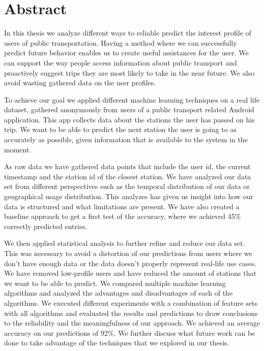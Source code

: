 \newpage
\chapter*{\centering Abstract}

In this thesis we analyze different ways to reliable predict the interest profile of users of public transportation. Having a method where we can successfully predict future behavior enables us to create useful assistances for the user. We can support the way people access information about public transport and proactively suggest trips they are most likely to take in the near future. We also avoid wasting gathered data on the user profiles.

To achieve our goal we applied different machine learning techniques on a real life dataset, gathered anonymously from users of a public transport related Android application. This app collects data about the stations the user has passed on his trip. We want to be able to predict the next station the user is going to as accurately as possible, given information that is available to the system in the moment.

As raw data we have gathered data points that include the user id, the current timestamp and the station id of the closest station. We have analyzed our data set from different perspectives such as the temporal distribution of our data or geographical usage distribution. This analyzes has given us insight into how our data is structured and what limitations are present. We have also created a baseline approach to get a first test of the accuracy, where we achieved 45\% correctly predicted entries.

We then applied statistical analysis to further refine and reduce our data set. This was necessary to avoid a distortion of our predictions from users where we don't have enough data or the data doesn't properly represent real-life use cases. We have removed low-profile users and have reduced the amount of stations that we want to be able to predict. We compared multiple machine learning algorithms and analyzed the advantages and disadvantages of each of the algorithms. We executed different experiments with a combination of feature sets with all algorithms and evaluated the results and predictions to draw conclusions to the reliability and the meaningfulness of our approach. We achieved an average accuracy on our predictions of 92\%. We further discuss what future work can be done to take advantage of the techniques that we explored in our thesis.
